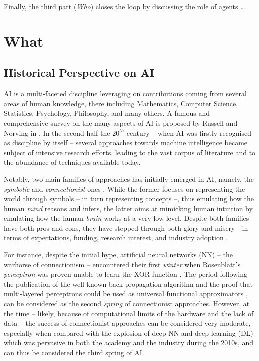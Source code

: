 \documentclass[12pt,a4paper,openright,twoside]{book}
\begin{document}
Finally, the third part (\emph{Who}) closes the loop by discussing the role of agents \ldots
{}


\part{What}
\label{part:what}

\chapter{Historical Perspective on AI}

AI is a multi-faceted discipline leveraging on contributions coming from several areas of human knowledge, there including Mathematics, Computer Science, Statistics, Psychology, Philosophy, and many others.
%
A famous and comprehensive survey on the many aspects of AI is proposed by Russell and Norving in \cite{russell2016artificial}.
%
In the second half the $20^{th}$ century -- when AI was firstly recognised as discipline by itself -- several approaches towards machine intelligence became subject of intensive research efforts, leading to the vast corpus of literature and to the abundance of techniques available today.

Notably, two main families of approaches has initially emerged in AI, namely, the \emph{symbolic} and \emph{connectionist} ones \cite{Smolensky1987, SUN2001783}.
%
While the former focuses on representing the world through symbols -- in turn representing concepts --, thus emulating how the human \emph{mind} reasons and infers, the latter aims at mimicking human intuition by emulating how the human \emph{brain} works at a very low level.
%
Despite both families have both pros and cons, they have stepped through both glory and misery---in terms of expectations, funding, research interest, and industry adoption \cite{Hendler2008, russell2016artificial}.

For instance, despite the initial hype, artificial neural networks (NN) -- the warhorse of connectionism -- encountered their first \emph{winter} when Rosenblatt's \emph{perceptron} \cite{rosenblatt1957perceptron} was proven unable to learn the XOR function \cite{Minsky1988}.
%
The period following the publication of the well-known back-propagation algorithm \cite{Rumelhart1986} and the proof that multi-layered perceptrons could be used as universal functional approximators \cite{Cybenko1989}, can be considered as the second \emph{spring} of connectionist approaches.
%
However, at the time -- likely, because of computational limits of the hardware and the lack of data -- the success of connectionist approaches can be considered very moderate, especially when compared with the explosion of deep NN and deep learning (DL) \cite{goodfellow2016deep} which was pervasive in both the academy and the industry during the 2010s, and can thus be considered the third spring of AI.
\end{document}
